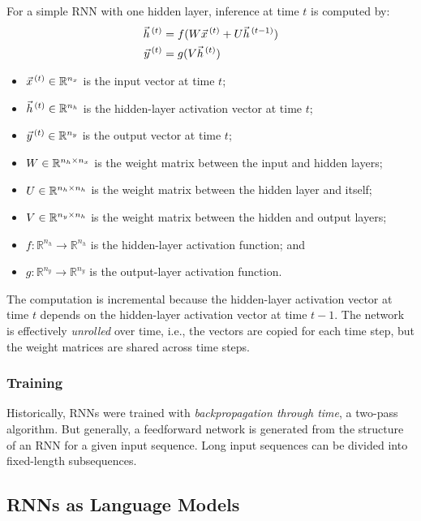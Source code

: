 For a simple RNN with one hidden layer, inference at time $t$ is computed by:
\begin{align}
  \vec{h}^{\,(t)} & = f(W \vec{x}^{\,(t)} + U \vec{h}^{\,(t - 1)}) \\
  \vec{y}^{\,(t)} & = g(V \vec{h}^{\,(t)})
\end{align}
\begin{itemize}
  \item $\vec{x}^{\,(t)} \in \mathbb{R}^{n_x}$ is the input vector at time $t$;
  \item $\vec{h}^{\,(t)} \in \mathbb{R}^{n_h}$ is the hidden-layer activation vector at time $t$;
  \item $\vec{y}^{\,(t)} \in \mathbb{R}^{n_y}$ is the output vector at time $t$;
  \item $W \in \mathbb{R}^{n_h \times n_x}$ is the weight matrix between the input and hidden layers;
  \item $U \in \mathbb{R}^{n_h \times n_h}$ is the weight matrix between the hidden layer and itself;
  \item $V \in \mathbb{R}^{n_y \times n_h}$ is the weight matrix between the hidden and output layers;
  \item $f : \mathbb{R}^{n_h} \to \mathbb{R}^{n_h}$ is the hidden-layer activation function; and
  \item $g : \mathbb{R}^{n_y} \to \mathbb{R}^{n_y}$ is the output-layer activation function.
\end{itemize}
The computation is incremental because the hidden-layer activation vector at
time $t$ depends on the hidden-layer activation vector at time $t - 1$.
The network is effectively \textit{unrolled} over time, i.e., the vectors are
copied for each time step, but the weight matrices are shared across time steps.

\subsubsection{Training}

Historically, RNNs were trained with \textit{backpropagation through time}, a
two-pass algorithm.
But generally, a feedforward network is generated from the structure of an RNN
for a given input sequence.
Long input sequences can be divided into fixed-length subsequences.

\subsection{RNNs as Language Models}

